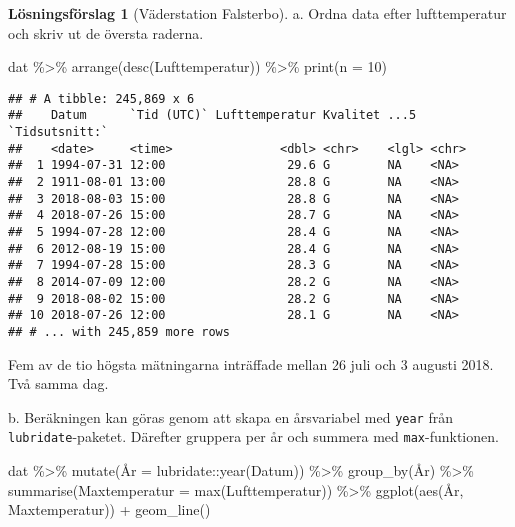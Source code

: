 \documentclass[
]{book}
\newenvironment{Shaded}{\begin{snugshade}}{\end{snugshade}}
\newcommand{\AttributeTok}[1]{\textcolor[rgb]{0.77,0.63,0.00}{#1}}
\newcommand{\DecValTok}[1]{\textcolor[rgb]{0.00,0.00,0.81}{#1}}
\newcommand{\FunctionTok}[1]{\textcolor[rgb]{0.00,0.00,0.00}{#1}}
\newcommand{\NormalTok}[1]{#1}
\newcommand{\SpecialCharTok}[1]{\textcolor[rgb]{0.00,0.00,0.00}{#1}}
\theoremstyle{definition}
\theoremstyle{definition}
\theoremstyle{definition}
\theoremstyle{definition}
\newtheorem{hypothesis}{Lösningsförslag}[chapter]
\theoremstyle{remark}
\begin{document}
\begin{hypothesis}[Väderstation Falsterbo]
a. Ordna data efter lufttemperatur och skriv ut de översta raderna.

\begin{Shaded}
\begin{Highlighting}[]
\NormalTok{dat }\SpecialCharTok{\%\textgreater{}\%} \FunctionTok{arrange}\NormalTok{(}\FunctionTok{desc}\NormalTok{(Lufttemperatur)) }\SpecialCharTok{\%\textgreater{}\%} \FunctionTok{print}\NormalTok{(}\AttributeTok{n =} \DecValTok{10}\NormalTok{)}
\end{Highlighting}
\end{Shaded}

\begin{verbatim}
## # A tibble: 245,869 x 6
##    Datum      `Tid (UTC)` Lufttemperatur Kvalitet ...5  `Tidsutsnitt:`
##    <date>     <time>               <dbl> <chr>    <lgl> <chr>         
##  1 1994-07-31 12:00                 29.6 G        NA    <NA>          
##  2 1911-08-01 13:00                 28.8 G        NA    <NA>          
##  3 2018-08-03 15:00                 28.8 G        NA    <NA>          
##  4 2018-07-26 15:00                 28.7 G        NA    <NA>          
##  5 1994-07-28 12:00                 28.4 G        NA    <NA>          
##  6 2012-08-19 15:00                 28.4 G        NA    <NA>          
##  7 1994-07-28 15:00                 28.3 G        NA    <NA>          
##  8 2014-07-09 12:00                 28.2 G        NA    <NA>          
##  9 2018-08-02 15:00                 28.2 G        NA    <NA>          
## 10 2018-07-26 12:00                 28.1 G        NA    <NA>          
## # ... with 245,859 more rows
\end{verbatim}

Fem av de tio högsta mätningarna inträffade mellan 26 juli och 3 augusti 2018. Två samma dag.

b. Beräkningen kan göras genom att skapa en årsvariabel med \texttt{year} från \texttt{lubridate}-paketet. Därefter gruppera per år och summera med \texttt{max}-funktionen.

\begin{Shaded}
\begin{Highlighting}[]
\NormalTok{dat }\SpecialCharTok{\%\textgreater{}\%}
  \FunctionTok{mutate}\NormalTok{(Å}\AttributeTok{r =}\NormalTok{ lubridate}\SpecialCharTok{::}\FunctionTok{year}\NormalTok{(Datum)) }\SpecialCharTok{\%\textgreater{}\%} 
  \FunctionTok{group\_by}\NormalTok{(År) }\SpecialCharTok{\%\textgreater{}\%} 
  \FunctionTok{summarise}\NormalTok{(}\AttributeTok{Maxtemperatur =} \FunctionTok{max}\NormalTok{(Lufttemperatur)) }\SpecialCharTok{\%\textgreater{}\%} 
  \FunctionTok{ggplot}\NormalTok{(}\FunctionTok{aes}\NormalTok{(År, Maxtemperatur)) }\SpecialCharTok{+}
  \FunctionTok{geom\_line}\NormalTok{()}
\end{Highlighting}
\end{Shaded}


\end{hypothesis}
\end{document}
